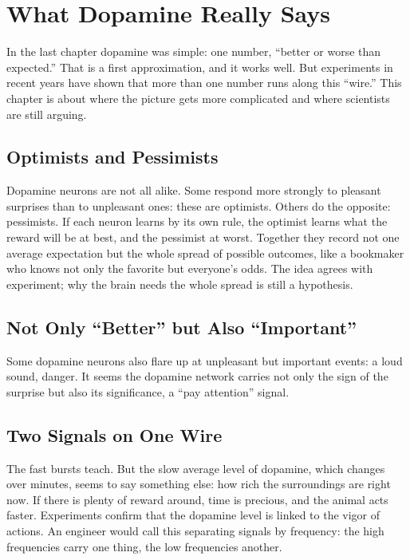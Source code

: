 \chapter{What Dopamine Really Says}

In the last chapter dopamine was simple: one number, ``better or worse than expected.'' That is a first approximation, and it works well. But experiments in recent years have shown that more than one number runs along this ``wire.'' This chapter is about where the picture gets more complicated and where scientists are still arguing.

\section*{Optimists and Pessimists}

Dopamine neurons are not all alike. Some respond more strongly to pleasant surprises than to unpleasant ones: these are optimists. Others do the opposite: pessimists. If each neuron learns by its own rule, the optimist learns what the reward will be at best, and the pessimist at worst. Together they record not one average expectation but the whole spread of possible outcomes, like a bookmaker who knows not only the favorite but everyone's odds. The idea agrees with experiment; why the brain needs the whole spread is still a hypothesis.


\section*{Not Only ``Better'' but Also ``Important''}

Some dopamine neurons also flare up at unpleasant but important events: a loud sound, danger. It seems the dopamine network carries not only the sign of the surprise but also its significance, a ``pay attention'' signal.

\section*{Two Signals on One Wire}

The fast bursts teach. But the slow average level of dopamine, which changes over minutes, seems to say something else: how rich the surroundings are right now. If there is plenty of reward around, time is precious, and the animal acts faster. Experiments confirm that the dopamine level is linked to the vigor of actions. An engineer would call this separating signals by frequency: the high frequencies carry one thing, the low frequencies another.

